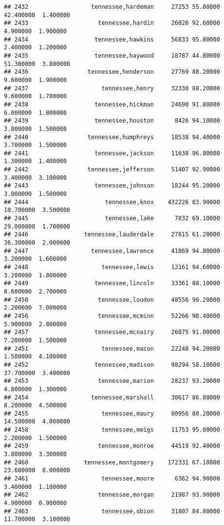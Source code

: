 \documentclass[
]{article}
\begin{document}
\begin{verbatim}
## 2432                  tennessee,hardeman     27253 55.80000 42.400000  1.400000
## 2433                    tennessee,hardin     26026 92.60000  4.900000  1.900000
## 2434                   tennessee,hawkins     56833 95.80000  2.400000  1.200000
## 2435                   tennessee,haywood     18787 44.80000 51.300000  3.800000
## 2436                 tennessee,henderson     27769 88.20000  9.600000  1.900000
## 2437                     tennessee,henry     32330 88.20000  9.600000  1.700000
## 2438                   tennessee,hickman     24690 91.80000  6.000000  1.800000
## 2439                   tennessee,houston      8426 94.10000  3.800000  1.500000
## 2440                 tennessee,humphreys     18538 94.40000  3.700000  1.500000
## 2441                   tennessee,jackson     11638 96.80000  1.300000  1.400000
## 2442                 tennessee,jefferson     51407 92.90000  3.400000  3.100000
## 2443                   tennessee,johnson     18244 95.20000  3.000000  1.500000
## 2444                      tennessee,knox    432226 83.90000 10.700000  3.500000
## 2445                      tennessee,lake      7832 69.10000 29.000000  1.700000
## 2446                tennessee,lauderdale     27815 61.20000 36.300000  2.000000
## 2447                  tennessee,lawrence     41869 94.80000  3.200000  1.600000
## 2448                     tennessee,lewis     12161 94.60000  3.200000  1.800000
## 2449                   tennessee,lincoln     33361 88.10000  8.600000  2.700000
## 2450                    tennessee,loudon     48556 90.20000  2.200000  7.000000
## 2456                    tennessee,mcminn     52266 90.40000  5.900000  2.800000
## 2457                   tennessee,mcnairy     26075 91.00000  7.200000  1.500000
## 2451                     tennessee,macon     22248 94.20000  1.500000  4.100000
## 2452                   tennessee,madison     98294 58.10000 37.700000  3.400000
## 2453                    tennessee,marion     28237 93.20000  4.800000  1.300000
## 2454                  tennessee,marshall     30617 86.80000  8.200000  4.500000
## 2455                     tennessee,maury     80956 80.20000 14.500000  4.800000
## 2458                     tennessee,meigs     11753 95.80000  2.200000  1.500000
## 2459                    tennessee,monroe     44519 92.40000  3.800000  3.300000
## 2460                tennessee,montgomery    172331 67.10000 23.600000  8.000000
## 2461                     tennessee,moore      6362 94.90000  3.400000  1.100000
## 2462                    tennessee,morgan     21987 93.90000  4.900000  0.900000
## 2463                     tennessee,obion     31807 84.80000 11.700000  3.100000

\end{verbatim}
\end{document}
